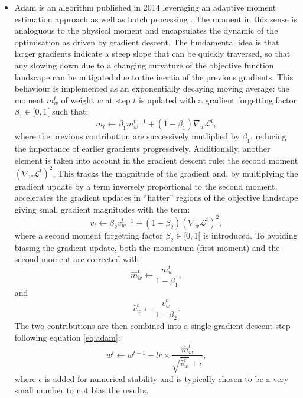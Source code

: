 \begin{itemize}
    \item Adam is an algorithm published in 2014 leveraging an adaptive moment estimation approach as well as batch processing \cite{adamPaper}. The moment in this sense is analoguous to the physical moment and encapsulates the dynamic of the optimisation as driven by gradient descent. The fundamental idea is that larger gradients indicate a steep slope that can be quickly traversed, so that any slowing down due to a changing curvature of the objective function landscape can be mitigated due to the inertia of the previous gradients. This behaviour is implemented as an exponentially decaying moving average: the moment $m^t_w$ of weight $w$ at step $t$ is updated with a gradient forgetting factor $\beta_1 \in [0, 1[$ such that: \[ m_t \leftarrow \beta_1 m^{t-1}_w + (1 - \beta_1) \nabla_w \mathcal{L}^t,\] where the previous contribution are successively mutliplied by $\beta_1$, reducing the importance of earlier gradients progressively. Additionally, another element is taken into account in the gradient descent rule: the second moment $(\nabla_w \mathcal{L}^t)^2$. This tracks the magnitude of the gradient and, by multiplying the gradient update by a term inversely proportional to the second moment, accelerates the gradient updates in ``flatter'' regions of the objective landscape giving small gradient magnitudes with the term: \[ v_t \leftarrow \beta_2 v^{t-1}_w + (1 - \beta_2) (\nabla_w \mathcal{L}^t)^2,\] where a second moment forgetting factor $\beta_2 \in [0, 1[$ is introduced. To avoiding biasing the gradient update, both the momentum (first moment) and the second moment are corrected with \[\hat{m}^t_w \leftarrow \frac{m^t_w}{1 - \beta_1},\] and \[\hat{v}^t_w \leftarrow \frac{v^t_w}{1 - \beta_2}.\] The two contributions are then combined into a single gradient descent step following equation \ref{eq:adam}:
    \begin{equation}\label{eq:adam}
        w^{t} \leftarrow w^{t-1} - lr \times \frac{\hat{m}^t_w}{\sqrt{\hat{v}^t_w} + \epsilon},
    \end{equation}
    where $\epsilon$ is added for numerical stability and is typically chosen to be a very small number to not bias the results.
\end{itemize}

